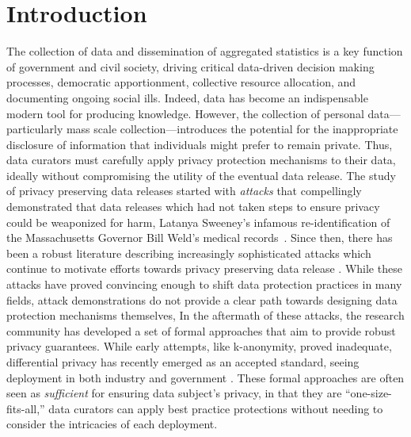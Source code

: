 
\section{Introduction}
The collection of data and dissemination of aggregated statistics is a key function of government and civil society, driving critical data-driven decision making processes, \eg democratic apportionment, collective resource allocation, and documenting ongoing social ills.  Indeed, data has become an indispensable modern tool for producing knowledge. 
However, the collection of personal data---particularly mass scale collection---introduces the potential for the inappropriate disclosure of information that individuals might prefer to remain private. 
Thus, data curators must carefully apply privacy protection mechanisms to their data, ideally without compromising the utility of the eventual data release. 
The study of privacy preserving data releases started with \emph{attacks} that compellingly demonstrated that data releases which had not taken steps to ensure privacy could be weaponized for harm, \eg Latanya Sweeney’s infamous re-identification of the Massachusetts Governor Bill Weld’s medical records~\cite{sweeney}. Since then, there has been a robust literature describing increasingly sophisticated attacks which continue to motivate efforts towards privacy preserving data release \cite{transyouthintexas,censusreconstruction,censusreconstruction2,USENIX:Cohen22}. While these attacks have proved convincing enough to shift data protection practices in many fields, attack demonstrations do not provide a clear path towards designing data protection mechanisms themselves,  In the aftermath of these attacks, the research community has developed a set of formal approaches that aim to provide robust privacy guarantees. While early attempts, like k-anonymity, proved inadequate, differential privacy \cite{DworkMNS16j} has recently emerged as an accepted standard, seeing deployment in both industry \cite{CCS:ErlPihKor14,apple2017,ding2017collecting,tezapsidis2017uber} and government \cite{abowd2018us}. 
These formal approaches are often seen as \emph{sufficient} for ensuring data subject's privacy, 
in that they are ``one-size-fits-all,'' \ie data curators can apply best practice protections without needing to consider the intricacies of each deployment.

